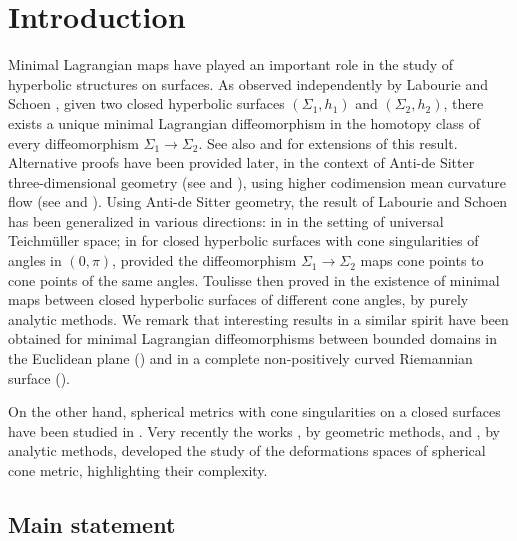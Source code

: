 \documentclass[JEP,XML,SOM,Unicode,NoEqCountersInSection,published]{cedram}
\theoremstyle{definition}
\begin{document}
\maketitle
\tableofcontents
\mainmatter

\section{Introduction}

Minimal Lagrangian maps have played an important role in the study of hyperbolic structures on surfaces. As observed independently by Labourie \cite{labourieCP} and Schoen \cite{Schoenharmonic}, given two closed hyperbolic surfaces $(\Sigma_1,h_1)$ and $(\Sigma_2,h_2)$, there exists a unique minimal Lagrangian diffeomorphism in the homotopy class of every diffeomorphism $\Sigma_1\to\Sigma_2$. See also \cite{zbMATH00827487} and \cite{zbMATH00870993,graham} for extensions of this result. Alternative proofs have been provided later, in the context of Anti-de Sitter three-dimensional geometry (see \cite{foliationCMC} and \cite[\S 7]{survey}), using higher codimension mean curvature flow (see \cite{zbMATH01744223} and \cite{zbMATH05996706}). Using Anti-de Sitter geometry, the result of Labourie and Schoen has been generalized in various directions: in \cite{bon_schl,zbMATH06902491} in the setting of universal Teichmüller space; in \cite{zbMATH06680278} for closed hyperbolic surfaces with cone singularities of angles in $(0,\pi)$, provided the diffeomorphism $\Sigma_1\to\Sigma_2$ maps cone points to cone points of the same angles. Toulisse then proved in \cite{zbMATH07149810} the existence of minimal maps between closed hyperbolic surfaces of different cone angles, by purely analytic methods. We remark that interesting results in a similar spirit have been obtained for minimal Lagrangian diffeomorphisms between bounded domains in the Euclidean plane (\cite{zbMATH00032290,zbMATH01145655}) and in a complete non-positively curved Riemannian surface (\cite{zbMATH05346543}).

On the other hand, spherical metrics with cone singularities on a closed surfaces have been studied in \cite{zbMATH03988171,zbMATH04073390,zbMATH04142953,zbMATH04194621,zbMATH00126050}. Very recently the works \cite{zbMATH06992339,zbMATH07091755,mondpanov2}, by geometric methods, and \cite{zbMATH06741332,zbMATH07197533,mazzeozhu2}, by analytic methods, developed the study of the deformations spaces of spherical cone metric, highlighting their complexity.

\subsection{Main statement}
\end{document}
